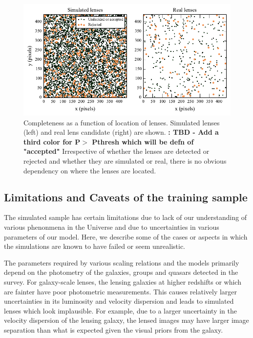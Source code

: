\documentclass[useAMS,usenatbib,a4paper]{mn2e}
\begin{document}
\begin{figure}
\begin{center}
\includegraphics[scale=0.95]{sw-cfhtls-figs/completeness_pos.pdf}
\caption{ \label{fig:comppos}
Completeness as a function of location of lenses. Simulated lenses (left) and
real lens candidate (right) are shown. {\bf: TBD - Add a third color for
P$>$ Pthresh which will be defn of "accepted"} Irrespective of whether the
lenses are detected or rejected and whether they are simulated or real,
there is no obvious dependency on where the lenses are located. 
}
\end{center}
\end{figure}

\subsection{Limitations and Caveats of the training sample}
The simulated sample has certain limitations due to lack of our understanding of
various phenonmena in the Universe and due to uncertainties in various
parameters of our model. Here, we describe some of the cases or aspects in which the
simulations are known to have failed or seem unrealistic. 

The parameters required by various scaling relations and the models primarily
depend on the photometry of the galaxies, groups and quasars detected in the
survey. For galaxy-scale lenses, the lensing galaxies at higher redshifts or
which are fainter have poor photometric measurements. This causes relatively
larger uncertainties in its luminosity and velocity dispersion and leads to
simulated lenses which look implausible. For example, due to a larger
uncertainty in the velocity dispersion of the lensing galaxy, the lensed images
may have larger image separation than what is expected given the visual priors
from the galaxy.
\end{document}
